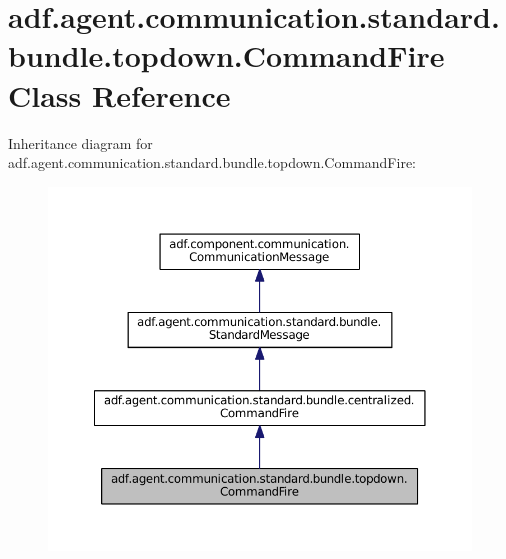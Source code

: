 \hypertarget{classadf_1_1agent_1_1communication_1_1standard_1_1bundle_1_1topdown_1_1CommandFire}{}\section{adf.\+agent.\+communication.\+standard.\+bundle.\+topdown.\+Command\+Fire Class Reference}
\label{classadf_1_1agent_1_1communication_1_1standard_1_1bundle_1_1topdown_1_1CommandFire}


Inheritance diagram for adf.\+agent.\+communication.\+standard.\+bundle.\+topdown.\+Command\+Fire\+:
\nopagebreak
\begin{figure}[H]
\begin{center}
\leavevmode
\includegraphics[width=350pt]{classadf_1_1agent_1_1communication_1_1standard_1_1bundle_1_1topdown_1_1CommandFire__inherit__graph}
\end{center}
\end{figure}


